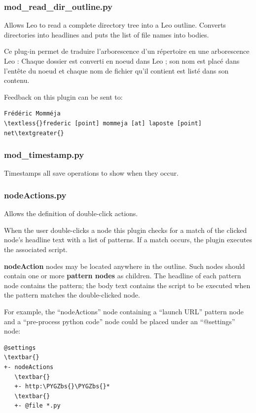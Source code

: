 \documentclass[a4paper,10pt,english]{sphinxmanual}
\def\PYGZbs{\char`\\}
\begin{document}
\subsubsection{mod\_read\_dir\_outline.py}
\label{plugins:mod-read-dir-outline-py}
Allows Leo to read a complete directory tree into a Leo outline. Converts
directories into headlines and puts the list of file names into bodies.

Ce plug-in permet de traduire l'arborescence d'un répertoire en une arborescence
Leo : Chaque dossier est converti en noeud dans Leo ; son nom est placé dans
l'entête du noeud et chaque nom de fichier qu'il contient est listé dans son
contenu.

Feedback on this plugin can be sent to:

\begin{Verbatim}[commandchars=\\\{\}]
Frédéric Momméja
\textless{}frederic [point] mommeja [at] laposte [point] net\textgreater{}
\end{Verbatim}


\subsubsection{mod\_timestamp.py}
\label{plugins:mod-timestamp-py}
Timestamps all save operations to show when they occur.


\subsubsection{nodeActions.py}
\label{plugins:nodeactions-py}
Allows the definition of double-click actions.

When the user double-clicks a node this plugin checks for a match of the clicked
node's headline text with a list of patterns. If a match occurs, the plugin
executes the associated script.

\textbf{nodeAction} nodes may be located anywhere in the outline. Such nodes should
contain one or more \textbf{pattern nodes} as children. The headline of each pattern
node contains the pattern; the body text contains the script to be executed when
the pattern matches the double-clicked node.

For example, the ``nodeActions'' node containing a ``launch URL'' pattern node
and a ``pre-process python code'' node could be placed under an ``@settings''
node:

\begin{Verbatim}[commandchars=\\\{\}]
@settings
\textbar{}
+- nodeActions
   \textbar{}
   +- http:\PYGZbs{}\PYGZbs{}*
   \textbar{}
   +- @file *.py
\end{Verbatim}
\end{document}
